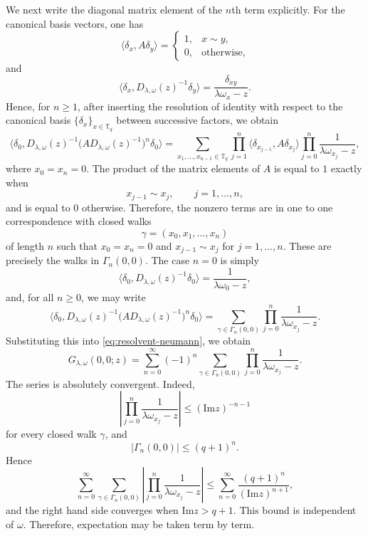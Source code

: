 \documentclass[a4paper,11pt]{article}
\newcommand{\Impart}{\mathrm{Im}}
\begin{document}
We next write the diagonal matrix element of the $n$th term explicitly.
For the canonical basis vectors, one has
$$
\langle \delta_x,A\delta_y\rangle =
\begin{cases}
1, & x\sim y,\\
0, & \text{otherwise},
\end{cases}
$$
and
$$
\langle \delta_x,D_{\lambda,\omega}(z)^{-1}\delta_y\rangle
=
\frac{\delta_{xy}}{\lambda\omega_x-z}.
$$
Hence, for $n\ge1$, after inserting the resolution of identity with
respect to the canonical basis $\{\delta_x\}_{x\in\mathbb T_q}$ between
successive factors, we obtain
$$
\langle \delta_0,
D_{\lambda,\omega}(z)^{-1}
\bigl(A D_{\lambda,\omega}(z)^{-1}\bigr)^n
\delta_0\rangle
=
\sum_{x_1,\dots,x_{n-1}\in\mathbb T_q}
\prod_{j=1}^{n}\langle \delta_{x_{j-1}},A\delta_{x_j}\rangle
\prod_{j=0}^{n}\frac{1}{\lambda\omega_{x_j}-z},
$$
where $x_0=x_n=0$.
The product of the matrix elements of $A$ is equal to $1$ exactly when
$$
x_{j-1}\sim x_j,
\qquad
j=1,\dots,n,
$$
and is equal to $0$ otherwise.
Therefore, the nonzero terms are in one to one correspondence with closed walks
$$
\gamma=(x_0,x_1,\dots,x_n)
$$
of length $n$ such that $x_0=x_n=0$ and $x_{j-1}\sim x_j$ for $j=1,\dots,n$. 
These are precisely the walks in $\Gamma_n(0,0)$.
The case $n=0$ is simply
$$
\langle \delta_0,D_{\lambda,\omega}(z)^{-1}\delta_0\rangle
=
\frac{1}{\lambda\omega_0-z},
$$
and, for all $n\ge0$, we may write
$$
\langle \delta_0,
D_{\lambda,\omega}(z)^{-1}
\bigl(A D_{\lambda,\omega}(z)^{-1}\bigr)^n
\delta_0\rangle
=
\sum_{\gamma\in\Gamma_n(0,0)}
\prod_{j=0}^{n}\frac{1}{\lambda\omega_{x_j}-z}.
$$
Substituting this into \eqref{eq:resolvent-neumann}, we obtain
\begin{equation}
\label{eq:path-expansion-z}
G_{\lambda,\omega}(0,0;z)
=
\sum_{n=0}^{\infty}(-1)^n
\sum_{\gamma\in\Gamma_n(0,0)}
\prod_{j=0}^{n}\frac{1}{\lambda\omega_{x_j}-z}.
\end{equation}
The series is absolutely convergent. 
Indeed,
$$
\left|
\prod_{j=0}^{n}\frac{1}{\lambda\omega_{x_j}-z}
\right|
\le
(\Impart z)^{-n-1}
$$
for every closed walk $\gamma$, and
$$
|\Gamma_n(0,0)|\le (q+1)^n.
$$
Hence
$$
\sum_{n=0}^{\infty}
\sum_{\gamma\in\Gamma_n(0,0)}
\left|
\prod_{j=0}^{n}\frac{1}{\lambda\omega_{x_j}-z}
\right|
\le
\sum_{n=0}^{\infty}
\frac{(q+1)^n}{(\Impart z)^{n+1}},
$$
and the right hand side converges when $\Impart z>q+1$. 
This bound is independent of $\omega$. 
Therefore, expectation may be taken term by term.
\end{document}
